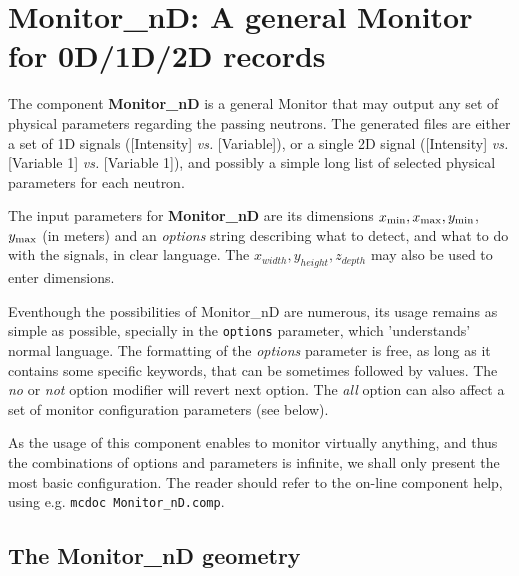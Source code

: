 \section{Monitor\_nD: A general Monitor for 0D/1D/2D records}
\label{s:monitornd}


The component {\bf Monitor\_nD} is a general Monitor that may output any
set of physical parameters regarding the passing neutrons. The
generated files are either a set of 1D signals ([Intensity] {\it vs.}
[Variable]), or a single 2D signal ([Intensity] {\it vs.} [Variable 1]
{\it vs.} [Variable 1]), and possibly a simple long list of selected
physical parameters for each neutron.

The input parameters for {\bf Monitor\_nD} are its dimensions $x_{\rm
  min}, x_{\rm max}, y_{\rm min}$, $y_{\rm max}$ (in meters) and an {\it
  options} string describing what to detect, and what to do with the
signals, in clear language. The $x_{width}, y_{height}, z_{depth}$ may also be used to enter dimensions.

Eventhough the possibilities of Monitor\_nD are numerous, its usage remains as simple as possible, specially in the \verb+options+ parameter, which 'understands' normal language.
The formatting of the {\it options}
parameter is free, as long as it contains some specific keywords, that
can be sometimes followed by values. The {\it no} or {\it not} option
modifier will revert next option. The {\it all} option can also affect a
set of monitor configuration parameters (see below).

As the usage of this component enables to monitor virtually anything, and thus the combinations of options and parameters is infinite, we shall only present the most basic configuration. The reader should refer to the on-line component help, using e.g. \verb+mcdoc Monitor_nD.comp+.

\subsection{The Monitor\_nD geometry}

